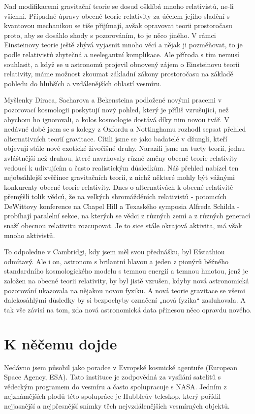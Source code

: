   Nad modifikacemi gravitační teorie se dosud ošklíbá mnoho relativistů, ne-li všichni. Případné
  úpravy obecné teorie relativity za účelem jejího sladění s kvantovou mechanikou se tiše přijímají,
  avšak opravovat teorii prostoročasu proto, aby se dosáhlo shody s pozorováním, to je něco jiného.
  V rámci Einsteinovy teorie ještě zbývá vyjasnit mnoho věcí a nějak ji pozměňovat, to je podle
  relativistů zbytečná a neelegantní komplikace. Ale příroda s tím nemusí souhlasit, a když se u
  astronomů projevil obnovený zájem o Einsteinovu teorii relativity, máme možnost zkoumat základní
  zákony prostoročasu na základě pohledu do hlubších a vzdálenějších oblastí vesmíru. 
  
  Myšlenky Diraca, Sacharova a Bekensteina podložené novými pracemi v pozorovací kosmologii
  poskytují nový pohled, který je příliš vzrušující, než abychom ho ignorovali, a kolos kosmologie
  dostává díky nim novou tvář. V nedávné době jsem se s kolegy z Oxfordu a Nottinghamu rozhodl
  sepsat přehled alternativních teorií gravitace. Cítili jsme se jako badatelé v džungli, kteří
  objevují stále nové exotické živočišné druhy. Narazili jsme na tucty teorií, jednu zvláštnější než
  druhou, které navrhovaly různé změny obecné teorie relativity vedoucí k udivujícím a často
  realistickým důsledkům. Náš přehled nabízel ten nejobsáhlejší zvěřinec gravitačních teorií, z
  nichž některé mohly být vážnými konkurenty obecné teorie relativity. Dnes o alternativách k obecné
  relativitě přemýšlí tolik vědců, že na velkých shromážděních relativistů - potomcích DeWittovy
  konference na Chapel Hill a Texaského symposia Alfreda Schilda - probíhají paralelní sekce, na
  kterých se vědci z různých zemí a z různých generací snaží obecnou relativitu rozcupovat. Je to
  sice stále okrajová aktivita, má však mnoho aktivistů. 
  
  To odpoledne v Cambridgi, kdy jsem měl svou přednášku, byl Efstathiou odmítavý. Ale i on, astronom
  s brilantní hlavou a jeden z pionýrů běžného standardního kosmologického modelu s temnou energií a
  temnou hmotou, jenž je založen na obecné teorii relativity, by byl jistě vzrušen, kdyby nová
  astronomická pozorování ukazovala na nějakou novou fyziku. A nová teorie gravitace se všemi
  dalekosáhlými důsledky by si bezpochyby označení „nová fyzika“ zasluhovala. A tak vše závisí na
  tom, zda nová astronomická data přinesou něco opravdu nového.

\section{K něčemu dojde}\label{feyIchIIIsecXV}
  Nedávno jsem působil jako poradce v Evropské kosmické agentuře (European Space Agency, ESA). Tato
  instituce je zodpovědná za vysílání satelitů s vědeckým programem do vesmíru a často spolupracuje
  s NASA. Jedním z nejznámějších plodů této spolupráce je Hubbleův teleskop, který pořídil
  nejjasnější a nejpřesnější snímky těch nejvzdálenějších vesmírných objektů. 
  
